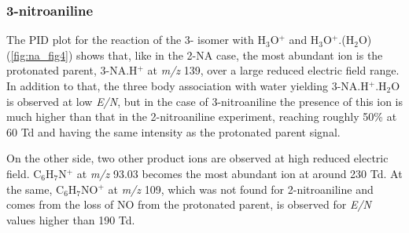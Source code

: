 \subsubsection{3-nitroaniline}
The PID plot for the reaction of the 3- isomer with H$_3$O$^+$ and H$_3$O$^+$.(H$_2$O) (\autoref{fig:na_fig4}) shows that, like in the 2-NA case, the most abundant ion is the protonated parent, 3-NA.H$^+$ at \textit{m/z} 139, over a large reduced electric field range.
In addition to that, the three body association with water yielding 3-NA.H$^+$.H$_2$O is observed at low \textit{E/N}, but in the case of 3-nitroaniline the presence of this ion is much higher than that in the 2-nitroaniline experiment, reaching roughly 50\% at 60 Td and having the same intensity as the protonated parent signal.

On the other side, two other product ions are observed at high reduced electric field.
C$_6$H$_7$N$^+$ at \textit{m/z} 93.03 becomes the most abundant ion at around 230 Td.
At the same, C$_6$H$_7$NO$^+$ at \textit{m/z} 109, which was not found for 2-nitroaniline and comes from the loss of NO from the protonated parent, is observed for \textit{E/N} values higher than 190 Td.




